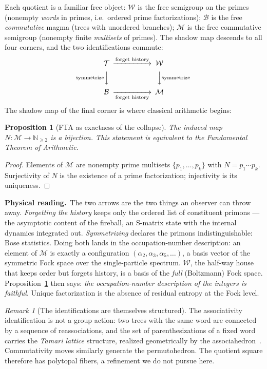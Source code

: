 \documentclass[11pt]{article}
\newcommand{\cT}{\mathcal{T}}   %
\newcommand{\cW}{\mathcal{W}}   %
\newcommand{\cB}{\mathcal{B}}   %
\newcommand{\cM}{\mathcal{M}}   %
\newcommand{\NN}{\mathbb{N}}
\newcommand{\physread}{\medskip\noindent\textbf{Physical reading.}\ }
\numberwithin{equation}{section}
\theoremstyle{plain}
\newtheorem{proposition}[theorem]{Proposition}
\theoremstyle{definition}
\theoremstyle{remark}
\newtheorem{remark}[theorem]{Remark}
\begin{document}
Each quotient is a familiar free object: $\cW$ is the free semigroup on the primes
(nonempty \emph{words} in primes, i.e.\ ordered prime factorizations); $\cB$ is the
free \emph{commutative} magma (trees with unordered branches); $\cM$ is the free
commutative semigroup (nonempty finite \emph{multisets} of primes). The shadow map
descends to all four corners, and the two identifications commute:
\[
\begin{CD}
\cT @>\text{forget history}>> \cW \\
@V\text{symmetrize}VV @VV\text{symmetrize}V \\
\cB @>>\text{forget history}> \cM
\end{CD}
\]
The shadow map of the final corner is where classical arithmetic begins:

\begin{proposition}[FTA as exactness of the collapse]\label{prop:fta}
The induced map $N \colon \cM \to \NN_{\ge2}$ is a bijection. This statement is
equivalent to the Fundamental Theorem of Arithmetic.
\end{proposition}

\begin{proof}
Elements of $\cM$ are nonempty prime multisets $\{p_1,\dots,p_k\}$ with
$N = p_1\cdots p_k$. Surjectivity of $N$ is the existence of a prime factorization;
injectivity is its uniqueness. \end{proof}

\physread The two arrows are the two things an observer can throw away.
\emph{Forgetting the history} keeps only the ordered list of constituent primons ---
the asymptotic content of the fireball, an S-matrix state with the internal dynamics
integrated out. \emph{Symmetrizing} declares the primons indistinguishable: Bose
statistics. Doing both lands in the occupation-number description: an element of
$\cM$ is exactly a configuration $(\alpha_2, \alpha_3, \alpha_5, \dots)$, a basis
vector of the symmetric Fock space over the single-particle spectrum. $\cW$, the
half-way house that keeps order but forgets history, is a basis of the \emph{full}
(Boltzmann) Fock space. Proposition~\ref{prop:fta} then says: \emph{the
occupation-number description of the integers is faithful}. Unique factorization is
the absence of residual entropy at the Fock level.

\begin{remark}[The identifications are themselves structured]
The associativity identification is not a group action: two trees with the same word
are connected by a sequence of reassociations, and the set of parenthesizations of a
fixed word carries the \emph{Tamari lattice} structure, realized geometrically by the
associahedron~\cite{tamari}. Commutativity moves similarly generate the permutohedron.
The quotient square therefore has polytopal fibers, a refinement we do not pursue
here.
\end{remark}
\end{document}
